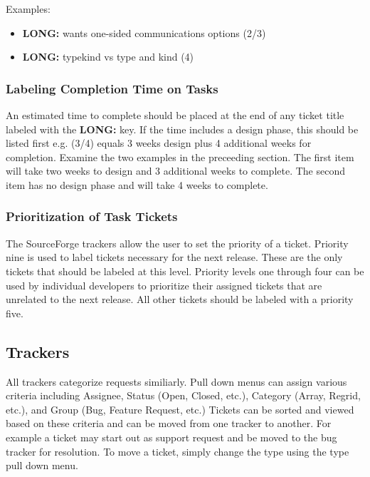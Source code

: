 \vspace{5mm}
Examples:
\begin{itemize}
\item  {\bf LONG:} wants one-sided communications options (2/3) 
\item  {\bf LONG:} typekind vs type and kind (4)
\end{itemize}

\subsubsection{Labeling Completion Time on Tasks}

An estimated time to complete should be placed at the end of any ticket title labeled with the {\bf LONG:} key. If the time includes a design phase,
this should be listed first e.g. (3/4) equals 3 weeks design plus 4 additional weeks for completion. Examine the two examples in the preceeding section. The first item will
take two weeks to design and 3 additional weeks to complete. The second item has no design phase and will take 4 weeks to complete. 

\subsubsection{Prioritization of Task Tickets}

The SourceForge trackers allow the user to set the priority of a ticket. Priority nine is used to label tickets necessary for the next release. These are the only tickets that should be labeled at this level. Priority levels one through four can be used by individual developers to prioritize their assigned 
tickets that are unrelated to the next release. All other tickets should be labeled with a priority five.

\subsection{Trackers}
\label{tracking_tools}

All trackers categorize requests similiarly. Pull down menus can assign various criteria including Assignee, Status (Open, Closed, etc.), Category (Array, Regrid, etc.), and Group (Bug, Feature Request, etc.)  Tickets can be sorted and viewed based on these criteria and can be moved from one tracker to another. For example a ticket may start out as support request and be moved to the bug tracker for resolution.  To move a ticket, simply change the type using the type pull down menu. 

